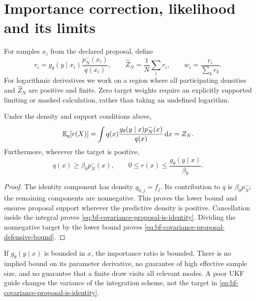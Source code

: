 \section{Importance correction, likelihood and its limits}

For samples \(x_i\) from the declared proposal, define
\begin{equation}
\label{eq:bf-covariance-proposal-importance-ratio}
 r_i=g_\theta(y\mid x_i)\frac{p_N^-(x_i)}{q(x_i)},\qquad
 \widehat Z_N=\frac1N\sum_i r_i,\qquad
 w_i=\frac{r_i}{\sum_k r_k}.
\end{equation}
For logarithmic derivatives we work on a region where all participating
densities and \(\widehat Z_N\) are positive and finite.
Zero target weights require an explicitly supported limiting or masked
calculation, rather than taking an undefined logarithm.

\begin{proposition}
Under the density and support conditions above,
\begin{equation}
\label{eq:bf-covariance-proposal-is-identity}
 \mathbb E_q[r(X)]
 =\int q(x)\frac{g_\theta(y\mid x)p_N^-(x)}{q(x)}\,\mathrm d x
 =Z_N .
\end{equation}
Furthermore, wherever the target is positive,
\begin{equation}
\label{eq:bf-covariance-proposal-defensive-bound}
 q(x)\geq\beta_0p_N^-(x),\qquad
 0\leq r(x)\leq\frac{g_\theta(y\mid x)}{\beta_0}.
\end{equation}
\end{proposition}
\begin{proof}
The identity component has density \(q_{0,j}=f_j\). Its contribution to
\(q\) is \(\beta_0p_N^-\); the remaining components are nonnegative.
This proves the lower bound and ensures proposal support wherever the
predictive density is positive. Cancellation inside the integral proves
\eqref{eq:bf-covariance-proposal-is-identity}. Dividing the nonnegative target by the lower
bound proves \eqref{eq:bf-covariance-proposal-defensive-bound}.
\end{proof}

If \(g_\theta(y\mid x)\) is bounded in \(x\), the importance ratio is
bounded. There is no implied bound on its parameter derivative, no
guarantee of high effective sample size, and no guarantee that a finite
draw visits all relevant modes. A poor UKF guide changes the variance of
the integration scheme, not the target in \eqref{eq:bf-covariance-proposal-is-identity}.

